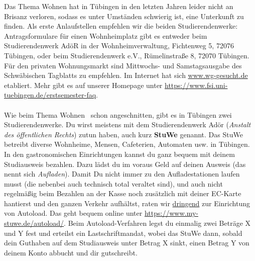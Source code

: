     Das Thema Wohnen hat in Tübingen in den letzten Jahren leider nicht an Brisanz verloren, sodass
    es unter Umständen schwierig ist, eine Unterkunft zu finden. Als erste Anlaufstellen empfehlen wir
    die beiden Studierendenwerke: Antragsformulare für einen Wohnheimplatz gibt es entweder beim
    Studierendenwerk AdöR in der Wohnheimverwaltung, Fichtenweg 5, 72076 Tübingen, oder beim Studierendenwerk
    e.V., Rümelinstraße 8, 72070 Tübingen. Für den privaten Wohnungsmarkt sind Mittwochs- und Samstagsausgabe
    des Schwäbischen Tagblatts zu empfehlen.
    Im Internet hat sich \url{www.wg-gesucht.de} etabliert. Mehr gibt es auf unserer Homepage unter \url{https://www.fsi.uni-tuebingen.de/erstsemester-faq}. \\\\

    Wie beim Thema \glqq Wohnen \grqq \ schon angeschnitten, gibt es in Tübingen zwei Studierendenwerke.
    Du wirst meistens mit dem Studierendenwerk Adör (\textit{Anstalt des öffentlichen Rechts}) zutun haben, auch kurz \textbf{StuWe} genannt.
    Das StuWe betreibt diverse Wohnheime, Mensen, Cafeterien, Automaten usw. in Tübingen. In den gastronomischen Einrichtungen
    kannst du ganz bequem mit deinem Studiausweis bezahlen. Dazu lädst du im voraus Geld auf deinen Ausweis (das nennt sich \textit{Aufladen}).
    Damit Du nicht immer zu den Aufladestationen laufen musst (die nebenbei auch technisch total veraltet sind), und auch nicht
    regelmäßig beim Bezahlen an der Kasse noch zusätzlich mit deiner EC-Karte hantierst und den ganzen Verkehr aufhältst, raten 
    wir \underline{dringend} zur Einrichtung von Autoload. Das geht bequem online unter \url{https://www.my-stuwe.de/autoload/}.
    Beim Autoload-Verfahren legst du einmalig zwei Beträge X und Y fest und erteilst ein Lastschriftmandat, 
    wobei das StuWe dann, sobald dein Guthaben auf dem Studiausweis unter Betrag X sinkt, einen Betrag Y von deinem Konto abbucht und dir gutschreibt.

